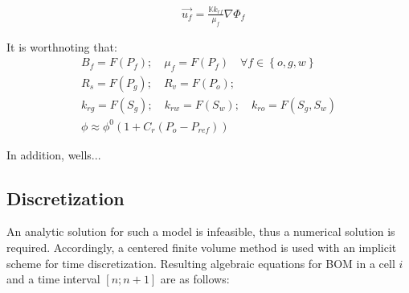 \documentclass[review]{elsarticle}
\begin{document}
\begin{align}
	\label{ec:Darcy}
	&\vec{u_{f}} =\frac{\mathbb{K} k_{rf}}{\mu_{f} } \nabla{\Phi_{f}}
\end{align} 

It is worthnoting that:
\begin{equation}
	\begin{aligned}
	B_{f}= F(P_{f}); \quad
	\mu_{f}= F(P_{f}) \quad \forall f \in \left\lbrace o,g,w\right\rbrace  \\
	R_{s} = F(P_{g}); \quad
	R_{v} = F(P_{o}); \qquad\qquad\\
	k_{rg} = F(S_{g}); \quad
	k_{rw} = F(S_{w}); \quad
	k_{ro} = F(S_{g},S_{w}) \\
	\phi \approx \phi^{0}(1+ C_{r}(P_{o}-P_{ref})) \qquad\qquad
	\end{aligned}
\end{equation}

In addition, {\color{green} wells...}

\subsection{Discretization}
An analytic solution for such a model is infeasible, thus a numerical solution is required. Accordingly, a centered finite volume method is used with an implicit scheme for time discretization. Resulting algebraic equations for BOM in a cell $i$ and a time interval $\left[n;n+1 \right] $ are as follows:
\end{document}
